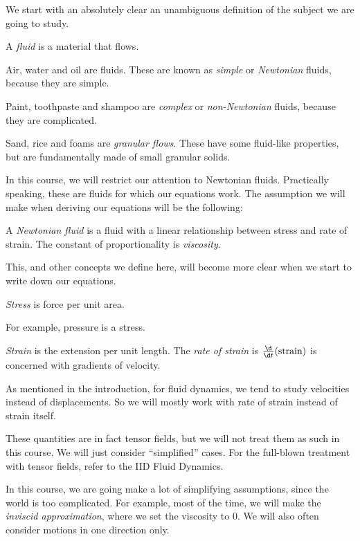 \documentclass[a4paper]{article}
\begin{document}
We start with an absolutely clear an unambiguous definition of the subject we are going to study.
\begin{defi}[Fluid]
  A \emph{fluid} is a material that flows.
\end{defi}

\begin{eg}
  Air, water and oil are fluids. These are known as \emph{simple} or \emph{Newtonian} fluids, because they are simple.

  Paint, toothpaste and shampoo are \emph{complex} or \emph{non-Newtonian} fluids, because they are complicated.

  Sand, rice and foams are \emph{granular flows}. These have some fluid-like properties, but are fundamentally made of small granular solids.
\end{eg}

In this course, we will restrict our attention to Newtonian fluids. Practically speaking, these are fluids for which our equations work. The assumption we will make when deriving our equations will be the following:

\begin{defi}
  A \emph{Newtonian fluid} is a fluid with a linear relationship between stress and rate of strain. The constant of proportionality is \emph{viscosity}.
\end{defi}
This, and other concepts we define here, will become more clear when we start to write down our equations.

\begin{defi}[Stress]
  \emph{Stress} is force per unit area.
\end{defi}
For example, pressure is a stress.

\begin{defi}[Strain]
  \emph{Strain} is the extension per unit length. The \emph{rate of strain} is $\frac{\d}{\d t}(\mathrm{strain})$ is concerned with gradients of velocity.
\end{defi}
As mentioned in the introduction, for fluid dynamics, we tend to study velocities instead of displacements. So we will mostly work with rate of strain instead of strain itself.

These quantities are in fact tensor fields, but we will not treat them as such in this course. We will just consider ``simplified'' cases. For the full-blown treatment with tensor fields, refer to the IID Fluid Dynamics.

In this course, we are going make a lot of simplifying assumptions, since the world is too complicated. For example, most of the time, we will make the \emph{inviscid approximation}, where we set the viscosity to $0$. We will also often consider motions in one direction only.
\end{document}
